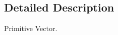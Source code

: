 \begin{DoxyCompactItemize}
\end{DoxyCompactItemize}


\subsection{Detailed Description}
Primitive Vector. 

